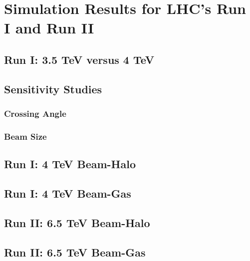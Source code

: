 \section{Simulation Results for LHC's Run I and Run II}

\subsection{Run I: 3.5 TeV versus 4 TeV}
\subsection{Sensitivity Studies}
\subsubsection{Crossing Angle}
\subsubsection{Beam Size}

\subsection{Run I: 4 TeV Beam-Halo}
\subsection{Run I: 4 TeV Beam-Gas}

\subsection{Run II: 6.5 TeV Beam-Halo}
\subsection{Run II: 6.5 TeV Beam-Gas}

